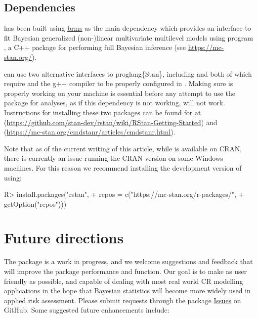 \documentclass[
  shortnames]{jss}
\begin{document}
\hypertarget{dependencies}{%
\subsection{Dependencies}\label{dependencies}}

 has been built using
\href{https://github.com/paul-buerkner/brms}{brms} \citep{Burkner2017} as the main dependency which provides an interface to fit Bayesian generalized
(non-)linear multivariate multilevel models using  program \citep{stan2021}, a C++ package
for performing full Bayesian inference (see \url{https://mc-stan.org/}).

 can use two alternative interfaces to proglang\{Stan\}, including  \citep{rstan2021} and  \citep{cmdstanr2022}
both of which require  and the g++ compiler to be properly configured in .
Making sure  is properly working on your machine is essential before any
attempt to use the  package for analyses, as if this dependency is not
working,  will not work. Instructions for installing these two packages can be found for  at (\url{https://github.com/stan-dev/rstan/wiki/RStan-Getting-Started}) and  (\url{https://mc-stan.org/cmdstanr/articles/cmdstanr.html}).

Note that as of the current writing of this article, while  is available on CRAN, there is currently an issue running the CRAN version on some Windows machines. For this reason we recommend installing the development version of  using:

\begin{CodeChunk}
\begin{CodeInput}
R> install.packages("rstan", 
+                  repos = c("https://mc-stan.org/r-packages/", 
+                            getOption("repos")))
\end{CodeInput}
\end{CodeChunk}

\hypertarget{future-directions}{%
\section{Future directions}\label{future-directions}}

The  package is a work in progress, and we welcome suggestions and feedback that will improve the package performance and function. Our goal is to make  as user friendly as possible, and capable of dealing with most real world CR modelling applications in the hope that Bayesian statistics will become more widely used in applied risk assessment. Please submit requests through the package \href{https://github.com/open-AIMS/bayesnec/issues}{Issues} on GitHub. Some suggested future enhancements include:
\end{document}
